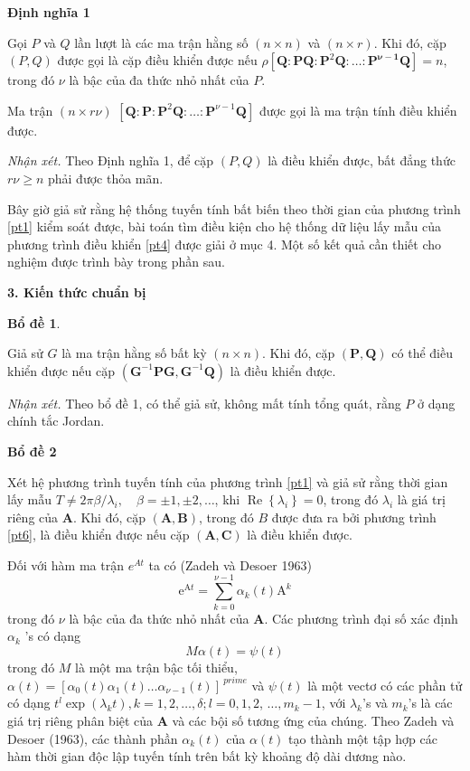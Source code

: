 \documentclass[12pt,a4paper]{article}
\begin{document}
\textbf{Định nghĩa 1}

Gọi $P$ và $Q$ lần lượt là các ma trận hằng số $(n \times n)$ và $(n \times r)$. Khi đó, cặp $(P, Q)$ được gọi là cặp điều khiển được nếu $\rho\left[\mathbf{Q}: \mathbf{P} \mathbf{Q}: \mathbf{P}^2 \mathbf{Q} : \ldots: \mathbf{P}^{\boldsymbol{\nu}-\mathbf{1}} \mathbf{Q}\right]=n$, trong đó $\nu$ là bậc của đa thức nhỏ nhất của $ P$.

Ma trận $(n \times r \nu)$ $\left[\mathbf{Q}: \mathbf{P}: \mathbf{P}^2 \mathbf{Q}: \ldots: \mathbf{P}^ {\nu-1} \mathbf{Q}\right]$ được gọi là ma trận tính điều khiển được.

\textit{Nhận xét.} Theo Định nghĩa 1, để cặp $(P, Q)$ là điều khiển được, bất đẳng thức $r \nu \geqslant n$ phải được thỏa mãn.

Bây giờ giả sử rằng hệ thống tuyến tính bất biến theo thời gian của phương trình \eqref{pt1} kiểm soát được, bài toán tìm điều kiện cho hệ thống dữ liệu lấy mẫu của phương trình điều khiển \eqref{pt4}  được giải ở mục 4. Một số kết quả cần thiết cho nghiệm được trình bày trong phần sau.

\textbf{3. Kiến thức chuẩn bị}

\textbf{Bổ đề 1}. 

Giả sử $G$ là ma trận hằng số bất kỳ $(n \times n)$. Khi đó, cặp $(\mathbf{P}, \mathbf{Q})$ có thể điều khiển được nếu cặp $\left(\mathbf{G}^{-1} \mathbf{P G}, \mathbf{G}^{-1} \mathbf{Q}\right)$ là điều khiển được.

\textit{Nhận xét.} Theo bổ đề 1, có thể giả sử, không mất tính tổng quát, rằng $P$ ở dạng chính tắc Jordan.

\textbf{Bổ đề 2}

Xét hệ phương trình tuyến tính của phương trình \ref{pt1} và giả sử rằng thời gian lấy mẫu $T \neq 2 \pi \beta / \lambda_i, \quad \beta= \pm 1, \pm 2, \ldots$, khi $\operatorname{Re}\left\{ \lambda_i\right\}=0$, trong đó $\lambda_i$ là giá trị riêng của $\mathbf{A}$. Khi đó, cặp $(\mathbf{A}, \mathbf{B})$, trong đó $B$ được đưa ra bởi phương trình \ref{pt6}, là điều khiển được nếu cặp $(\mathbf{A}, \mathbf{C})$ là điều khiển được.

Đối với hàm ma trận $e^{At}$ ta có (Zadeh và Desoer 1963)
\begin{equation}\tag{7}\label{pt7}
\mathrm{e}^{\mathrm{A} t}=\sum_{k=0}^{\nu-1} \alpha_k(t) \mathrm{A}^k
\end{equation}
trong đó $\nu$ là bậc của đa thức nhỏ nhất của $\mathbf{A}$. Các phương trình đại số xác định $\alpha_k$ 's có dạng
$$
M \alpha(t)=\psi(t)
$$
trong đó $M$ là một ma trận bậc tối thiểu, $\alpha(t)=\left[\alpha_0(t) \alpha_1(t) \ldots \alpha_{\nu-1}(t)\right]^{\ prime}$ và $\psi(t)$ là một vectơ có các phần tử có dạng $t^l \exp \left(\lambda_k t\right), k=1,2, \ldots, \delta ; l=0,1,2$, $\ldots, m_k-1$, với $\lambda_k$'s và $m_k$'s là các giá trị riêng phân biệt của $\mathbf{A}$ và các bội số tương ứng của chúng. Theo Zadeh và Desoer (1963), các thành phần $\alpha_k(t)$ của $\alpha(t)$ tạo thành một tập hợp các hàm thời gian độc lập tuyến tính trên bất kỳ khoảng độ dài dương nào.
\end{document}
